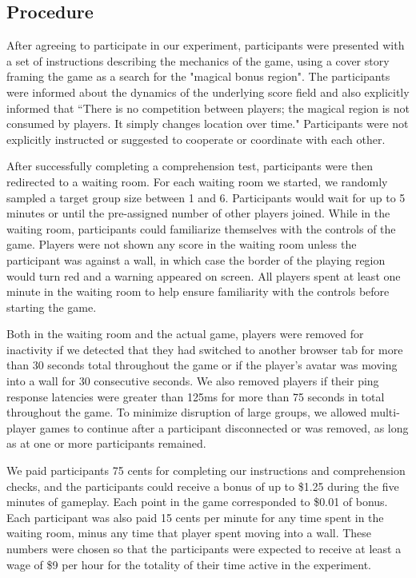 \documentclass[12pt,letterpaper]{article}
\begin{document}
\subsection{Procedure}

After agreeing to participate in our experiment, participants were presented with a set of instructions describing the mechanics of the game, using a cover story framing the game as a search for the "magical bonus region".  
The participants were informed about the dynamics of the underlying score field and also explicitly informed that ``There is no competition between players; the magical region is not consumed by players. It simply changes location over time." 
Participants were not explicitly instructed or suggested to cooperate or coordinate with each other.

After successfully completing a comprehension test, participants were then redirected to a waiting room.
For each waiting room we started, we randomly sampled a target group size between 1 and 6.
Participants would wait for up to 5 minutes or until the pre-assigned number of other players joined.
While in the waiting room, participants could familiarize themselves with the controls of the game.  Players were not shown any score in
the waiting room unless the participant was against a wall, in which
case the border of the playing region would turn red and a warning appeared on screen.  All players spent at least one minute in the waiting room to help ensure familiarity with the controls before starting the game. 

Both in the waiting room and the actual game, players were removed for inactivity if we detected that they had switched to another browser tab for more than 30 seconds total throughout the game or if the player's avatar was moving into a wall for 30 consecutive seconds.  
We also removed players if their ping response latencies were greater than 125ms for more than 75 seconds in total throughout the game.  
To minimize disruption of large groups, we allowed multi-player games to continue after a participant disconnected or was removed, as long as at one or more participants remained.

We paid participants 75 cents for completing our instructions and comprehension checks, and the participants could receive a bonus of up to \$1.25 during the five minutes of gameplay. Each point in the game corresponded to \$0.01 of bonus. Each participant was also paid 15 cents per minute for any time spent in the waiting room, minus any time that player spent moving into a wall.  These numbers were chosen so that the participants were expected to receive at least a wage of \$9 per hour for the totality of their time active in the
experiment.
\end{document}
